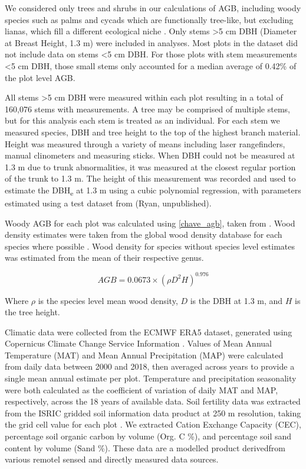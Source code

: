 \documentclass[11pt,a4paper]{article}
\begin{document}
We considered only trees and shrubs in our calculations of AGB, including woody species such as palms and cycads which are functionally tree-like, but excluding lianas, which fill a different ecological niche \citep{Selaya2008}. Only stems >5 cm DBH (Diameter at Breast Height, 1.3 m) were included in analyses. Most plots in the dataset did not include data on stems <5 cm DBH. For those plots with stem measurements <5 cm DBH, those small stems only accounted for a median average of 0.42\% of the plot level AGB.


All stems >5 cm DBH were measured within each plot resulting in a total of 160,076 stems with measurements. A tree may be comprised of multiple stems, but for this analysis each stem is treated as an individual. For each stem we measured species, DBH and tree height to the top of the highest branch material. Height was measured through a variety of means including laser rangefinders, manual clinometers and measuring sticks. When DBH could not be measured at 1.3 m due to trunk abnormalities, it was measured at the closest regular portion of the trunk to 1.3 m. The height of this measurement was recorded and used to estimate the DBH\textsubscript{e} at 1.3 m using a cubic polynomial regression, with parameters estimated using a test dataset from (Ryan, unpublished).

Woody AGB for each plot was calculated using \autoref{chave_agb}, taken from \citet{Chave2014}. Wood density estimates were taken from the global wood density database for each species where possible \citep{Chave2009, Zanne2009}. Wood density for species without species level estimates was estimated from the mean of their respective genus. 

\begin{equation}
	AGB = 0.0673 \times (\rho D^{2} H)^{0.976}
	\label{chave_agb}
\end{equation}

Where $\rho$ is the species level mean wood density, $D$ is the DBH at 1.3 m, and $H$ is the tree height.

Climatic data were collected from the ECMWF ERA5 dataset, generated using Copernicus Climate Change Service Information \citep{ERA5}. Values of Mean Annual Temperature (MAT) and Mean Annual Precipitation (MAP) were calculated from daily data between 2000 and 2018, then averaged across years to provide a single mean annual estimate per plot. Temperature and precipitation seasonality were both calculated as the coefficient of variation of daily MAT and MAP, respectively, across the 18 years of available data. Soil fertility data was extracted from the ISRIC gridded soil information data product at 250 m resolution, taking the grid cell value for each plot \citep{Hengl2017}. We extracted Cation Exchange Capacity (CEC), percentage soil organic carbon by volume (Org. C \%), and percentage soil sand content by volume (Sand \%). These data are a modelled product derivedfrom various remotel sensed and directly measured data sources. 
\end{document}
